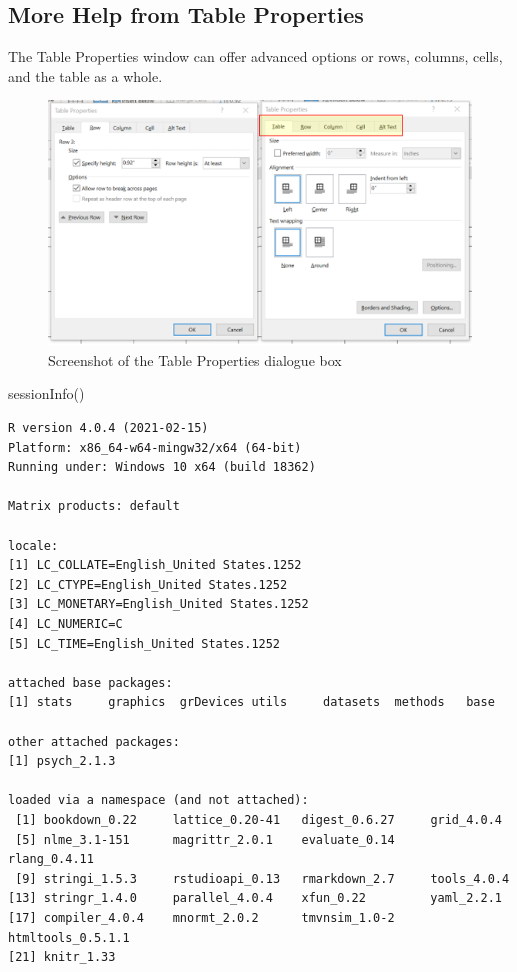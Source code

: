 \documentclass[
  english,
]{book}
\newenvironment{Shaded}{\begin{snugshade}}{\end{snugshade}}
\newcommand{\FunctionTok}[1]{\textcolor[rgb]{0.00,0.00,0.00}{#1}}
\newcommand{\NormalTok}[1]{#1}
\begin{document}
\hypertarget{more-help-from-table-properties}{%
\subsection{More Help from Table Properties}\label{more-help-from-table-properties}}

The Table Properties window can offer advanced options or rows, columns, cells, and the table as a whole.

\begin{figure}
\centering
\includegraphics{images/TableMagic/TableProperties.png}
\caption{Screenshot of the Table Properties dialogue box}
\end{figure}

\begin{Shaded}
\begin{Highlighting}[]
\FunctionTok{sessionInfo}\NormalTok{()}
\end{Highlighting}
\end{Shaded}

\begin{verbatim}
R version 4.0.4 (2021-02-15)
Platform: x86_64-w64-mingw32/x64 (64-bit)
Running under: Windows 10 x64 (build 18362)

Matrix products: default

locale:
[1] LC_COLLATE=English_United States.1252 
[2] LC_CTYPE=English_United States.1252   
[3] LC_MONETARY=English_United States.1252
[4] LC_NUMERIC=C                          
[5] LC_TIME=English_United States.1252    

attached base packages:
[1] stats     graphics  grDevices utils     datasets  methods   base     

other attached packages:
[1] psych_2.1.3

loaded via a namespace (and not attached):
 [1] bookdown_0.22     lattice_0.20-41   digest_0.6.27     grid_4.0.4       
 [5] nlme_3.1-151      magrittr_2.0.1    evaluate_0.14     rlang_0.4.11     
 [9] stringi_1.5.3     rstudioapi_0.13   rmarkdown_2.7     tools_4.0.4      
[13] stringr_1.4.0     parallel_4.0.4    xfun_0.22         yaml_2.2.1       
[17] compiler_4.0.4    mnormt_2.0.2      tmvnsim_1.0-2     htmltools_0.5.1.1
[21] knitr_1.33       
\end{verbatim}
\end{document}
